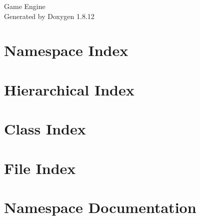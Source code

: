 \documentclass[twoside]{book}
\newcommand{\+}{\discretionary{\mbox{\scriptsize$\hookleftarrow$}}{}{}}
\newcommand{\clearemptydoublepage}{%
  \newpage{\pagestyle{empty}\cleardoublepage}%
}
\begin{document}
\hypersetup{pageanchor=false,
             bookmarksnumbered=true,
             pdfencoding=unicode
            }
\begin{titlepage}
\vspace*{7cm}
\begin{center}%
{\Large Game Engine }\\
\vspace*{1cm}
{\large Generated by Doxygen 1.8.12}\\
\end{center}
\end{titlepage}
\clearemptydoublepage
{}
\tableofcontents
\clearemptydoublepage
{}
\hypersetup{pageanchor=true}

\chapter{Namespace Index}

\chapter{Hierarchical Index}

\chapter{Class Index}

\chapter{File Index}

\chapter{Namespace Documentation}



\end{document}
